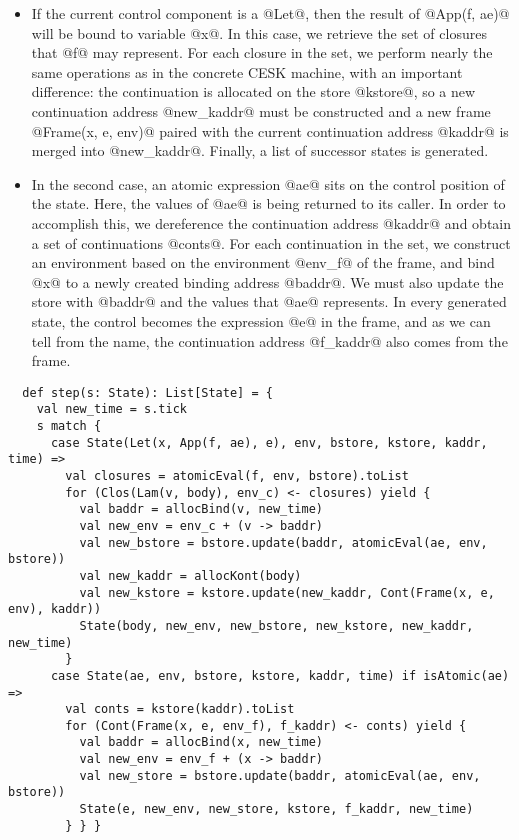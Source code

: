 \documentclass[acmsmall, screen]{acmart}\settopmatter{}
\begin{document}
\begin{itemize}
  \item If the current control component is a @Let@, then the result of @App(f, ae)@ will
    be bound to variable @x@. In this case, we retrieve the set of closures that @f@ may
    represent. For each closure in the set, we perform nearly the same operations as in the
    concrete CESK machine, with an important difference: the continuation is allocated on
    the store @kstore@, so a new continuation address @new_kaddr@ must be constructed and
    a new frame @Frame(x, e, env)@ paired with the current continuation address @kaddr@ is
    merged into @new_kaddr@. Finally, a list of successor states is generated.

  \item In the second case, an atomic expression @ae@ sits on the control position of the
    state. Here, the values of @ae@ is being returned to its caller.
    In order to accomplish this, we dereference the continuation address @kaddr@ and obtain
    a set of continuations @conts@. For each continuation in the set, we construct an
    environment based on the environment @env_f@ of the frame, and bind @x@ to a newly
    created binding address @baddr@. We must also update the store with @baddr@ and the
    values that @ae@ represents. In every generated state, the control becomes the expression
    @e@ in the frame, and as we can tell from the name, the continuation address @f_kaddr@
    also comes from the frame.
\end{itemize}

\begin{lstlisting}
  def step(s: State): List[State] = {
    val new_time = s.tick
    s match {
      case State(Let(x, App(f, ae), e), env, bstore, kstore, kaddr, time) =>
        val closures = atomicEval(f, env, bstore).toList
        for (Clos(Lam(v, body), env_c) <- closures) yield {
          val baddr = allocBind(v, new_time)
          val new_env = env_c + (v -> baddr)
          val new_bstore = bstore.update(baddr, atomicEval(ae, env, bstore))
          val new_kaddr = allocKont(body)
          val new_kstore = kstore.update(new_kaddr, Cont(Frame(x, e, env), kaddr))
          State(body, new_env, new_bstore, new_kstore, new_kaddr, new_time)
        }
      case State(ae, env, bstore, kstore, kaddr, time) if isAtomic(ae) =>
        val conts = kstore(kaddr).toList
        for (Cont(Frame(x, e, env_f), f_kaddr) <- conts) yield {
          val baddr = allocBind(x, new_time)
          val new_env = env_f + (x -> baddr)
          val new_store = bstore.update(baddr, atomicEval(ae, env, bstore))
          State(e, new_env, new_store, kstore, f_kaddr, new_time)
        } } }
\end{lstlisting}
\end{document}
